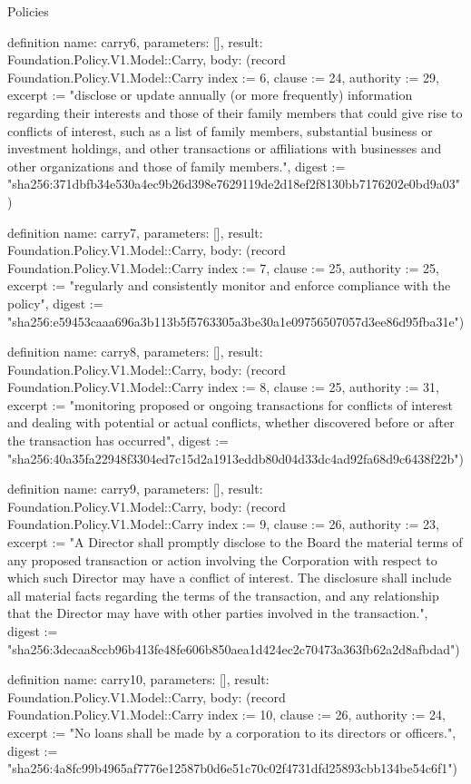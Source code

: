 \begin{lexlean}{Policies}
\begin{semanticmodule}
definition{
  name: carry6,
  parameters: [],
  result: Foundation.Policy.V1.Model::Carry,
  body: (record Foundation.Policy.V1.Model::Carry {index := 6, clause := 24, authority := 29, excerpt := "disclose or update annually (or more frequently) information regarding their interests and those of their family members that could give rise to conflicts of interest, such as a list of family members, substantial business or investment holdings, and other transactions or affiliations with businesses and other organizations and those of family members.", digest := "sha256:371dbfb34e530a4ec9b26d398e7629119de2d18ef2f8130bb7176202e0bd9a03"})
}

definition{
  name: carry7,
  parameters: [],
  result: Foundation.Policy.V1.Model::Carry,
  body: (record Foundation.Policy.V1.Model::Carry {index := 7, clause := 25, authority := 25, excerpt := "regularly and consistently monitor and enforce compliance with the policy", digest := "sha256:e59453caaa696a3b113b5f5763305a3be30a1e09756507057d3ee86d95fba31e"})
}

definition{
  name: carry8,
  parameters: [],
  result: Foundation.Policy.V1.Model::Carry,
  body: (record Foundation.Policy.V1.Model::Carry {index := 8, clause := 25, authority := 31, excerpt := "monitoring proposed or ongoing transactions for conflicts of interest and dealing with potential or actual conflicts, whether discovered before or after the transaction has occurred", digest := "sha256:40a35fa22948f3304ed7c15d2a1913eddb80d04d33dc4ad92fa68d9c6438f22b"})
}

definition{
  name: carry9,
  parameters: [],
  result: Foundation.Policy.V1.Model::Carry,
  body: (record Foundation.Policy.V1.Model::Carry {index := 9, clause := 26, authority := 23, excerpt := "A Director shall promptly disclose to the Board the material terms of any proposed transaction or action involving the Corporation with respect to which such Director may have a conflict of interest. The disclosure shall include all material facts regarding the terms of the transaction, and any relationship that the Director may have with other parties involved in the transaction.", digest := "sha256:3decaa8ccb96b413fe48fe606b850aea1d424ec2c70473a363fb62a2d8afbdad"})
}

definition{
  name: carry10,
  parameters: [],
  result: Foundation.Policy.V1.Model::Carry,
  body: (record Foundation.Policy.V1.Model::Carry {index := 10, clause := 26, authority := 24, excerpt := "No loans shall be made by a corporation to its directors or officers.", digest := "sha256:4a8fc99b4965af7776e12587b0d6e51c70c02f4731dfd25893cbb134be54c6f1"})
}


\end{semanticmodule}
\end{lexlean}
